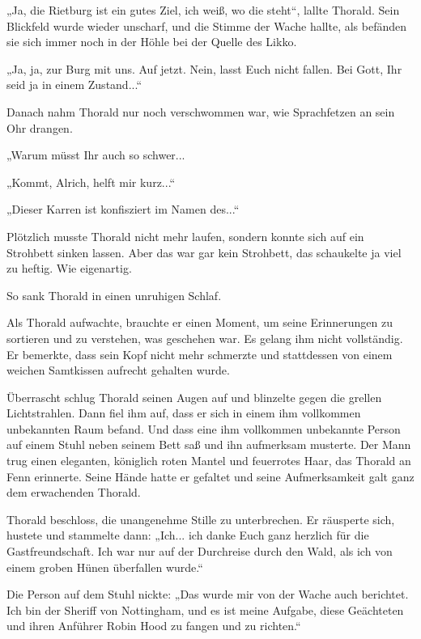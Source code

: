 „Ja, die Rietburg ist ein gutes Ziel, ich weiß, wo die steht“, lallte Thorald. Sein Blickfeld wurde wieder unscharf, und die Stimme der Wache hallte, als befänden sie sich immer noch in der Höhle bei der Quelle des Likko.

„Ja, ja, zur Burg mit uns. Auf jetzt. Nein, lasst Euch nicht fallen. Bei Gott, Ihr seid ja in einem Zustand...“

Danach nahm Thorald nur noch verschwommen war, wie Sprachfetzen an sein Ohr drangen.

„Warum müsst Ihr auch so schwer...

„Kommt, Alrich, helft mir kurz...“

„Dieser Karren ist konfisziert im Namen des...“

Plötzlich musste Thorald nicht mehr laufen, sondern konnte sich auf ein Strohbett sinken lassen. Aber das war gar kein Strohbett, das schaukelte ja viel zu heftig. Wie eigenartig.

So sank Thorald in einen unruhigen Schlaf.



\trennzeichen



Als Thorald aufwachte, brauchte er einen Moment, um seine Erinnerungen zu sortieren und zu verstehen, was geschehen war. Es gelang ihm nicht vollständig. Er bemerkte, dass sein Kopf nicht mehr schmerzte und stattdessen von einem weichen Samtkissen aufrecht gehalten wurde.

Überrascht schlug Thorald seinen Augen auf und blinzelte gegen die grellen Lichtstrahlen. Dann fiel ihm auf, dass er sich in einem ihm vollkommen unbekannten Raum befand. Und dass eine ihm vollkommen unbekannte Person auf einem Stuhl neben seinem Bett saß und ihn aufmerksam musterte. Der Mann trug einen eleganten, königlich roten Mantel und feuerrotes Haar, das Thorald an Fenn erinnerte. Seine Hände hatte er gefaltet und seine Aufmerksamkeit galt ganz dem erwachenden Thorald.

Thorald beschloss, die unangenehme Stille zu unterbrechen. Er räusperte sich, hustete und stammelte dann: „Ich... ich danke Euch ganz herzlich für die Gastfreundschaft. Ich war nur auf der Durchreise durch den Wald, als ich von einem groben Hünen überfallen wurde.“

Die Person auf dem Stuhl nickte: „Das wurde mir von der Wache auch berichtet. Ich bin der Sheriff von Nottingham, und es ist meine Aufgabe, diese Geächteten und ihren Anführer Robin Hood zu fangen und zu richten.“

